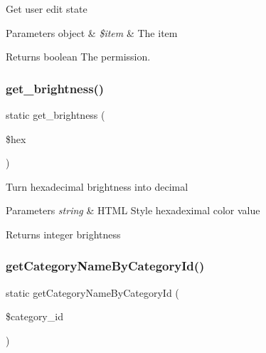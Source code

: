 Get user edit state


\begin{DoxyParams}[1]{Parameters}
object & {\em \$item} & The item\\
\hline
\end{DoxyParams}
\begin{DoxyReturn}{Returns}
boolean The permission. 
\end{DoxyReturn}
\mbox{\label{classtks__agenda_frontend_helper_aba764f0477d87b02a0e639730b6fa88e}} 
\subsubsection{get\+\_\+brightness()}
{\footnotesize\ttfamily static get\+\_\+brightness (\begin{DoxyParamCaption}\item[{}]{\$hex }\end{DoxyParamCaption})\hspace{0.3cm}{\ttfamily [static]}}

Turn hexadecimal brightness into decimal


\begin{DoxyParams}{Parameters}
{\em string} & H\+T\+ML Style hexadeximal color value\\
\hline
\end{DoxyParams}
\begin{DoxyReturn}{Returns}
integer brightness 
\end{DoxyReturn}
\mbox{\label{classtks__agenda_frontend_helper_ad3f58eb3d2461a0e06545e11ae5256a9}} 
\subsubsection{get\+Category\+Name\+By\+Category\+Id()}
{\footnotesize\ttfamily static get\+Category\+Name\+By\+Category\+Id (\begin{DoxyParamCaption}\item[{}]{\$category\+\_\+id }\end{DoxyParamCaption})\hspace{0.3cm}{\ttfamily [static]}}

